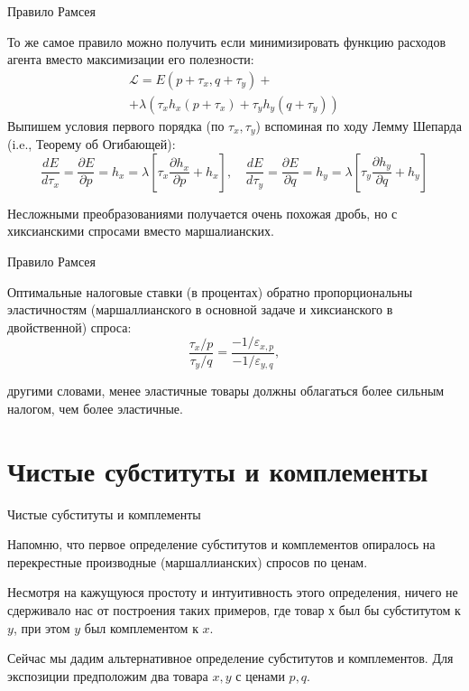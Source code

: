 \documentclass{beamer}
\begin{document}
\begin{frame}{Правило Рамсея}

То же самое правило можно получить если минимизировать функцию расходов агента вместо максимизации его полезности:
\begin{gather*}
\mathcal{L} = E(p+ \tau_x,q+\tau_y) + \\ + \lambda (\tau_x h_x(p+ \tau_x) + \tau_y h_y(q+\tau_y))
\end{gather*}
Выпишем условия первого порядка (по $\tau_x, \tau_y$) вспоминая по ходу Лемму Шепарда (i.e., Теорему об Огибающей):
$$\frac{d E}{d \tau_x} = \frac{\partial E}{\partial p} = h_x =  \lambda [\tau_x \frac{\partial h_x}{\partial p}+h_x], \quad \frac{d E}{d \tau_y} = \frac{\partial E}{\partial q} = h_y =  \lambda [\tau_y \frac{\partial h_y}{\partial q}+h_y]$$

Несложными преобразованиями получается очень похожая дробь, но с хиксианскими спросами вместо маршалианских.

\end{frame}

\begin{frame}{Правило Рамсея}

\begin{lemma}
Оптимальные налоговые ставки (в процентах) обратно пропорциональны эластичностям (маршаллианского в основной задаче и хиксианского в двойственной) спроса:
$$ \frac{\tau_x/p}{\tau_y/q} = \frac{-1/\varepsilon_{x,p}}{-1/\varepsilon_{y,q}},$$
\end{lemma}
другими словами, менее эластичные товары должны облагаться более сильным налогом, чем более эластичные.

\end{frame}

\section{Чистые субституты и комплементы}

\begin{frame}{Чистые субституты и комплементы}

Напомню, что первое определение субститутов и комплементов опиралось на перекрестные производные (маршаллианских) спросов по ценам. 

Несмотря на кажущуюся простоту и интуитивность этого определения, ничего не сдерживало нас от построения таких примеров, где товар $х$ был бы субститутом к $y$, при этом $y$ был комплементом к $x$.

Сейчас мы дадим альтернативное определение субститутов и комплементов. Для экспозиции предположим два товара $x,y$ с ценами $p,q$.
\end{frame}
\end{document}
